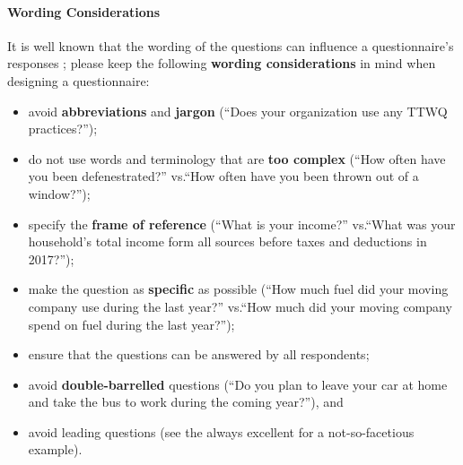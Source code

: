 \paragraph{Wording Considerations} It is well known that the wording of the questions can influence a questionnaire's responses \cite{DC_G}; please keep the following \textbf{wording considerations} in mind when designing a questionnaire:   
\begin{itemize}[noitemsep] 
\item avoid \textbf{abbreviations} and \textbf{jargon} (``Does your organization use any TTWQ practices?'');
\item do not use words and terminology that are \textbf{too complex} (``How often have you been defenestrated?'' vs.\@ ``How often have you been thrown out of a window?'');
\item specify the \textbf{frame of reference} (``What is your income?'' vs.\@ ``What was your household's total income form all sources before taxes and deductions in 2017?'');
\item make the question as \textbf{specific} as possible (``How much fuel did your moving company use during the last year?'' vs.\@ ``How much did your moving company  spend on fuel during the last year?'');
\item ensure that the questions can be answered by all respondents;
\item avoid \textbf{double-barrelled} questions (``Do you plan to leave your car at home and take the bus to work during the coming year?''), and 
\item avoid leading questions (see the always excellent \cite{DC_YPM} for a not-so-facetious example).
\end{itemize}

